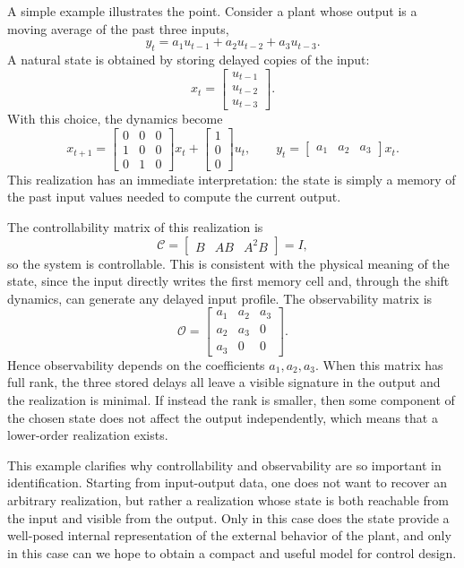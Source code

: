 A simple example illustrates the point. Consider a plant whose output is a moving average of the past three inputs,
\[
y_t = a_1u_{t-1}+a_2u_{t-2}+a_3u_{t-3}.
\]
A natural state is obtained by storing delayed copies of the input:
\[
x_t=
\begin{bmatrix}
u_{t-1}\\
u_{t-2}\\
u_{t-3}
\end{bmatrix}.
\]
With this choice, the dynamics become
\[
x_{t+1}
=
\begin{bmatrix}
0&0&0\\
1&0&0\\
0&1&0
\end{bmatrix}x_t
+
\begin{bmatrix}
1\\
0\\
0
\end{bmatrix}u_t,
\qquad
y_t=
\begin{bmatrix}
a_1 & a_2 & a_3
\end{bmatrix}x_t.
\]
This realization has an immediate interpretation: the state is simply a memory of the past input values needed to compute the current output.

The controllability matrix of this realization is
\[
\mathcal{C}=
\begin{bmatrix}
B & AB & A^2B
\end{bmatrix}=I,
\]
so the system is controllable. This is consistent with the physical meaning of the state, since the input directly writes the first memory cell and, through the shift dynamics, can generate any delayed input profile. The observability matrix is
\[
\mathcal{O}=
\begin{bmatrix}
a_1 & a_2 & a_3\\
a_2 & a_3 & 0\\
a_3 & 0 & 0
\end{bmatrix}.
\]
Hence observability depends on the coefficients \(a_1,a_2,a_3\). When this matrix has full rank, the three stored delays all leave a visible signature in the output and the realization is minimal. If instead the rank is smaller, then some component of the chosen state does not affect the output independently, which means that a lower-order realization exists.

This example clarifies why controllability and observability are so important in identification. Starting from input-output data, one does not want to recover an arbitrary realization, but rather a realization whose state is both reachable from the input and visible from the output. Only in this case does the state provide a well-posed internal representation of the external behavior of the plant, and only in this case can we hope to obtain a compact and useful model for control design.

